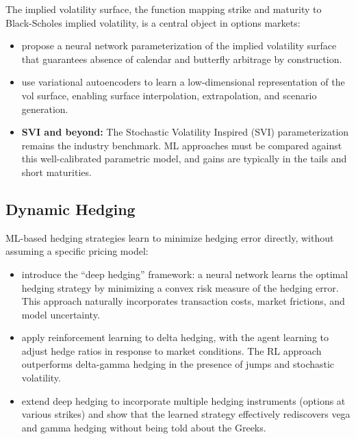 The implied volatility surface, the function mapping strike and maturity to Black-Scholes implied volatility, is a central object in options markets:

\begin{itemize}[leftmargin=*]
    \item \citet{Ackerer2020} propose a neural network parameterization of the implied volatility surface that guarantees absence of calendar and butterfly arbitrage by construction.

    \item \citet{Cohen2023} use variational autoencoders to learn a low-dimensional representation of the vol surface, enabling surface interpolation, extrapolation, and scenario generation.

    \item \textbf{SVI and beyond:} The Stochastic Volatility Inspired (SVI) parameterization \citep{Gatheral2014} remains the industry benchmark. ML approaches must be compared against this well-calibrated parametric model, and gains are typically in the tails and short maturities.
\end{itemize}

\subsection{Dynamic Hedging}

ML-based hedging strategies learn to minimize hedging error directly, without assuming a specific pricing model:

\begin{itemize}[leftmargin=*]
    \item \citet{Buehler2019} introduce the ``deep hedging'' framework: a neural network learns the optimal hedging strategy by minimizing a convex risk measure of the hedging error. This approach naturally incorporates transaction costs, market frictions, and model uncertainty.

    \item \citet{Cao2021} apply reinforcement learning to delta hedging, with the agent learning to adjust hedge ratios in response to market conditions. The RL approach outperforms delta-gamma hedging in the presence of jumps and stochastic volatility.

    \item \citet{Murray2022} extend deep hedging to incorporate multiple hedging instruments (options at various strikes) and show that the learned strategy effectively rediscovers vega and gamma hedging without being told about the Greeks.
\end{itemize}

